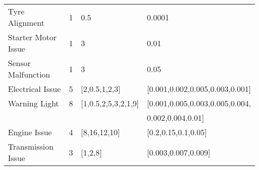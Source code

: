 \documentclass{article}
\begin{document}
\begin{table}[htbp]
\begin{tabular}{llll}
Tyre Alignment         & 1                 & 0.5                     & 0.0001                                               \\ 
Starter Motor Issue    & 1                 & 3                       & 0.01                                                 \\ 
Sensor Malfunction     & 1                 & 3                       & 0.05                                                 \\
Electrical Issue       & 5                 & {[}2,0.5,1,2,3{]}       & {[}0.001,0.002,0.005,0.003,0.001{]}                  \\ 
Warning Light          & 8                 & {[}1,0.5,2,5,3,2,1,9{]} & {[}0.001,0.005,0.003,0.005,0.004,\\
& & & 0.002,0.004.0.01{]} \\ 
Engine Issue           & 4                 & {[}8,16,12,10{]}        & {[}0.2,0.15,0.1,0.05{]}                              \\ 
Transmission Issue     & 3                 & {[}1,2,8{]}             & {[}0.003,0.007,0.009{]}                              \\ \hline
\end{tabular}
\end{table}
\end{document}
